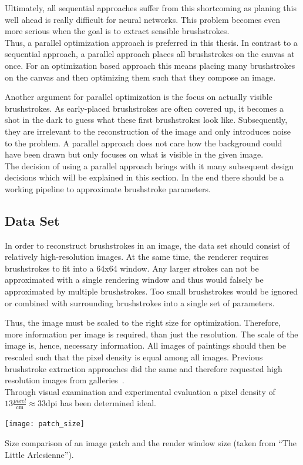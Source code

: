 Ultimately, all sequential approaches suffer from this shortcoming as planing this well ahead is really difficult for neural networks.
This problem becomes even more serious when the goal is to extract sensible brushstrokes.\\
Thus, a parallel optimization approach is preferred in this thesis.
In contrast to a sequential approach, a parallel approach places all brushstrokes on the canvas at once.
For an optimization based approach this means placing many brushstrokes on the canvas and then optimizing them such that they compose an image.

Another argument for parallel optimization is the focus on actually visible brushstrokes.
As early-placed brushstrokes are often covered up, it becomes a shot in the dark to guess what these first brushstrokes look like.
Subsequently, they are irrelevant to the reconstruction of the image and only introduces noise to the problem.
A parallel approach does not care how the background could have been drawn but only focuses on what is visible in the given image.\\

The decision of using a parallel approach brings with it many subsequent design decisions which will be explained in this section.
In the end there should be a working pipeline to approximate brushstroke parameters.

\subsection{Data Set}
In order to reconstruct brushstrokes in an image, the data set should consist of relatively high-resolution images.
At the same time, the renderer requires brushstrokes to fit into a 64x64 window.
Any larger strokes can not be approximated with a single rendering window and thus would falsely be approximated by multiple brushstrokes.
Too small brushstrokes would be ignored or combined with surrounding brushstrokes into a single set of parameters.

Thus, the image must be scaled to the right size for optimization.
Therefore, more information per image is required, than just the resolution.
The scale of the image is, hence, necessary information.
All images of paintings should then be rescaled such that the pixel density is equal among all images.
Previous brushstroke extraction approaches did the same and therefore requested high resolution images from galleries~\cite{rhythmic, lamberti}.\\
Through visual examination and experimental evaluation a pixel density of $13 \frac{\si{pixel}}{\si{\centi\meter}} \approx 33 \text{dpi}$ has been determined ideal.
\begin{marginfigure}
    \texttt{[image: patch\_size]}
    \caption{Size comparison of an image patch and the render window size (taken from ``The Little Arlesienne'').}
\end{marginfigure}

